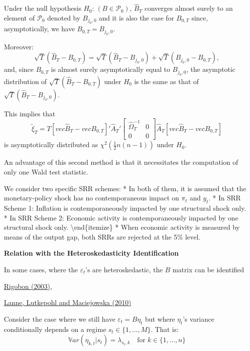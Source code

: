 \documentclass[
]{book}
\theoremstyle{definition}
\theoremstyle{definition}
\theoremstyle{definition}
\theoremstyle{definition}
\theoremstyle{remark}
\begin{document}
Under the null hypothesis \(H_0\): \((B \in \mathcal{P}_0)\), \(\hat{B}_T\) converges almost surely to an element of \(\mathcal{P}_0\) denoted by \(B_{j_0,0}\) and it is also the case for \(B_{0,T}\) since, asymptotically, we have \(B_{0,T}=B_{j_0,0}\).

Moreover:
\[
\sqrt{T}(\hat{B}_T - B_{0,T})=\sqrt{T}(\hat{B}_T - B_{j_0,0}) + \sqrt{T}(B_{j_0,0} - B_{0,T}),
\]
and, since \(B_{0,T}\) is almost surely asymptotically equal to \(B_{j_0,0}\), the asymptotic distribution of \(\sqrt{T}(\hat{B}_T - B_{0,T})\) under \(H_0\) is the same as that of \(\sqrt{T}(\hat{B}_T - B_{j_0,0})\).

This implies that
\[
\tilde\xi_{T} = T [vec\hat{B}_T-vec B_{0,T}]'\hat{A}_T'
\left[
\begin{array}{cc}
\hat{\Omega}^{-1}_T & 0\\
0&0
\end{array}
\right]\hat{A}_T
[vec\hat{B}_T-vec B_{0,T}]
\]
is asymptotically distributed as \(\chi^2\left(\frac{1}{2}n(n-1)\right)\) under \(H_0\).

An advantage of this second method is that it necessitates the computation of only one Wald test statistic.

We consider two specific SRR schemes:
* In both of them, it is assumed that the monetary-policy shock has no contemporaneous impact on \(\pi_t\) and \(y_t\).
* In SRR Scheme 1: Inflation is contemporaneously impacted by one structural shock only.
* In SRR Scheme 2: Economic activity is contemporaneously impacted by one structural shock only.
\textbackslash end\{itemize\}
* When economic activity is measured by means of the output gap, both SRRs are rejected at the 5\% level.

\textbf{Relation with the Heteroskedasticity Identification}

In some cases, where the \(\varepsilon_t\)'s are heteroskedastic, the \(B\) matrix can be identified

\href{/href\%7Bhttps://www.mitpressjournals.org/doi/10.1162/003465303772815727}{Rigobon (2003)},

\href{https://www.sciencedirect.com/science/article/pii/S0165188909001481\#!}{Lanne, Lutkepohl and Maciejowska (2010)}

Consider the case where we still have \(\varepsilon_t = B \eta_t\) but where \(\eta_t\)'s variance conditionally depends on a regime \(s_t \in \{1,\dots,M\}\). That is:
\[
\mathbb{V}ar(\eta_{k,t}|s_t) = \lambda_{s_t,k} \quad \mbox{for } k \in \{1,\dots,n\}
\]
\end{document}
